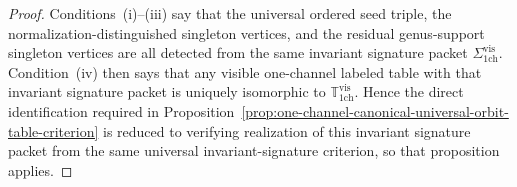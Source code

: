 \begin{proof}
Conditions~\textup{(i)}--\textup{(iii)} say that the universal ordered
seed triple, the normalization-distinguished singleton vertices, and
the residual genus-support singleton vertices are all detected from the
same invariant signature packet
$\Sigma_{\mathrm{1ch}}^{\mathrm{vis}}$.
Condition~\textup{(iv)} then says that any visible one-channel labeled
table with that invariant signature packet is uniquely isomorphic to
$\mathbb{T}_{\mathrm{1ch}}^{\mathrm{vis}}$.  Hence the direct
identification required in
Proposition~\ref{prop:one-channel-canonical-universal-orbit-table-criterion}
is reduced to verifying realization of this invariant signature packet
from the same universal invariant-signature criterion,
so that proposition applies.
\end{proof}

